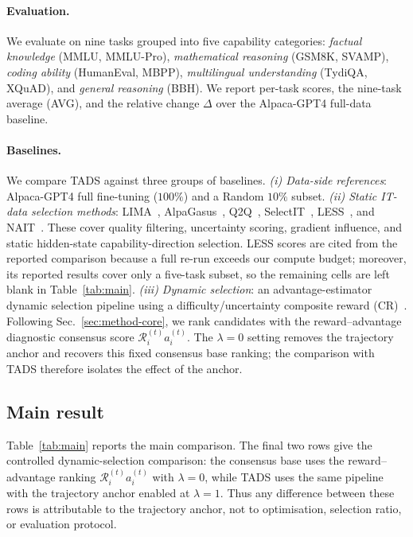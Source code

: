 \paragraph{Evaluation.}
We evaluate on nine tasks grouped into five capability categories:
\emph{factual knowledge} (MMLU, MMLU-Pro), \emph{mathematical
reasoning} (GSM8K, SVAMP), \emph{coding ability} (HumanEval, MBPP),
\emph{multilingual understanding} (TydiQA, XQuAD), and
\emph{general reasoning} (BBH). We report per-task scores, the
nine-task average (AVG), and the relative change $\Delta$ over the
Alpaca-GPT4 full-data baseline.

\paragraph{Baselines.}
We compare \textsc{TADS} against three groups of baselines.
\emph{(i) Data-side references}: Alpaca-GPT4 full fine-tuning
($100\%$) and a Random $10\%$ subset. \emph{(ii) Static IT-data
selection methods}: LIMA~\cite{zhou2023lima}, AlpaGasus~\cite{alpagasus},
Q2Q~\cite{q2q}, SelectIT~\cite{selectit}, LESS~\cite{less}, and
NAIT~\cite{nait2026}. These cover quality filtering, uncertainty
scoring, gradient influence, and static hidden-state
capability-direction selection. LESS scores are cited from the
reported comparison because a full re-run exceeds our compute
budget; moreover, its reported results cover only a five-task
subset, so the remaining cells are left blank in
Table~\ref{tab:main}. \emph{(iii) Dynamic selection}: an
advantage-estimator dynamic selection pipeline using a
difficulty/uncertainty composite reward (CR)~\cite{schulman2017ppo,
schulman2016gae,kung2023activeit}. Following
Sec.~\ref{sec:method-core}, we rank candidates with the
reward--advantage diagnostic consensus score
$\mathcal{R}_i^{(t)}a_i^{(t)}$. The $\lambda=0$ setting removes the
trajectory anchor and recovers this fixed consensus base ranking;
the comparison with \textsc{TADS} therefore isolates the effect of
the anchor.

\subsection{Main result}
\label{sec:main}

Table~\ref{tab:main} reports the main comparison. The final two rows
give the controlled dynamic-selection comparison: the consensus base
uses the reward--advantage ranking
$\mathcal{R}_i^{(t)}a_i^{(t)}$ with $\lambda=0$, while
\textsc{TADS} uses the same pipeline with the trajectory anchor
enabled at $\lambda=1$. Thus any difference between these rows is
attributable to the trajectory anchor, not to optimisation,
selection ratio, or evaluation protocol.

